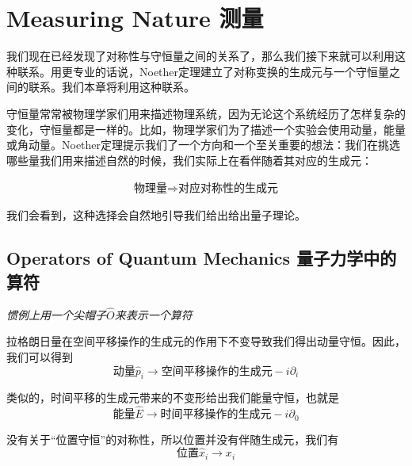 


\chapter[测量]{Measuring Nature 测量}\label{chap5}

我们现在已经发现了对称性与守恒量之间的关系了，那么我们接下来就可以利用这种联系。用更专业的话说，Noether定理建立了对称变换的生成元与一个守恒量之间的联系。我们本章将利用这种联系。

守恒量常常被物理学家们用来描述物理系统，因为无论这个系统经历了怎样复杂的变化，守恒量都是一样的。比如，物理学家们为了描述一个实验会使用动量，能量或角动量。Noether定理提示我们了一个方向和一个至关重要的想法：我们在挑选哪些量我们用来描述自然的时候，我们实际上在看伴随着其对应的生成元：

\begin{align}\label{eq5.1}
\text{物理量}\Rightarrow\text{对应对称性的生成元}
\end{align}

我们会看到，这种选择会自然地引导我们给出给出量子理论。

\section[量子力学中的算符]{Operators of Quantum Mechanics 量子力学中的算符}\label{sec5.1}

{\it 惯例上用一个尖帽子$\hat{O}$来表示一个算符}

拉格朗日量在空间平移操作的生成元的作用下不变导致我们得出动量守恒。因此，我们可以得到
\[\text{动量}\hat{p}_i\to\text{空间平移操作的生成元} - i\partial_i \]

类似的，时间平移的生成元带来的不变形给出我们能量守恒，也就是
\[\text{能量}\hat{E}\to\text{时间平移操作的生成元} - i\partial_0 \]

没有关于``位置守恒''的对称性，所以位置并没有伴随生成元，我们有
\[\text{位置}\hat{x}_i\to x_i \]

